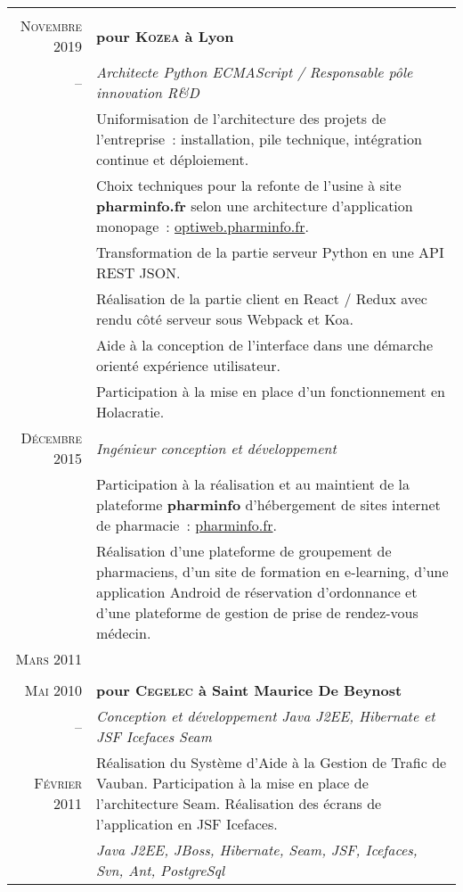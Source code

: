 \documentclass[a4paper,10pt]{article}
\begin{document}
  \begin{supertabular}{r|p{11cm}}
     \\
    \textsc{Novembre} 2019  & \textbf{pour \textsc{Kozea} à Lyon} \\
    -- & \emph{Architecte Python ECMAScript / Responsable pôle innovation R\&D} \\
    & \footnotesize{
      Uniformisation de l’architecture des projets de l’entreprise :
      installation, pile technique, intégration continue et déploiement.
    } \\
    & \footnotesize{
      Choix techniques pour la refonte de l’usine à site \textbf{pharminfo.fr}
      selon une architecture d’application monopage :
      \href{https://optiweb.pharminfo.fr}{optiweb.pharminfo.fr}.
    } \\
    & \footnotesize{
      Transformation de la partie serveur Python en une API REST JSON.
    } \\
    & \footnotesize{
      Réalisation de la partie client en React / Redux avec rendu côté serveur
      sous Webpack et Koa.
    } \\
    & \footnotesize{
      Aide à la conception de l’interface dans une démarche orienté expérience
      utilisateur.
    } \\
    & \footnotesize{
      Participation à la mise en place d’un fonctionnement en Holacratie.
    } \\
    \textsc{Décembre} 2015 & \emph{Ingénieur conception et développement} \\
    & \footnotesize{
      Participation à la réalisation et au maintient de la plateforme
      \textbf{pharminfo} d’hébergement de sites internet de pharmacie :
      \href{https://www.pharminfo.fr}{pharminfo.fr}.
    } \\
    & \footnotesize{
      Réalisation d'une plateforme de groupement de pharmaciens,
      d’un site de formation en e-learning,
      d'une application Android de réservation d’ordonnance et
      d'une plateforme de gestion de prise de rendez-vous médecin.
    } \\
    \footnotesize{\textsc{Mars} 2011} \\


     \\
    \textsc{Mai} 2010  & \textbf{pour \textsc{Cegelec} à Saint Maurice De Beynost} \\
    -- & \emph{Conception et développement Java J2EE, Hibernate et JSF Icefaces Seam} \\
    \footnotesize{\textsc{Février} 2011} & \footnotesize{Réalisation du Système d’Aide à la Gestion de Trafic de Vauban. Participation à la mise en place de l’architecture Seam. Réalisation des écrans de l’application en JSF Icefaces.} \\
    & \emph{Java J2EE, JBoss, Hibernate, Seam, JSF, Icefaces, Svn, Ant, PostgreSql} \\



\end{supertabular}
\end{document}
